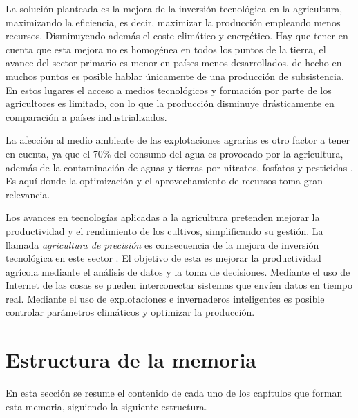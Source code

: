 \documentclass[a4paper, 12pt, oneside]{book}
\begin{document}
La solución planteada es la mejora de la inversión tecnológica en la agricultura, maximizando la eficiencia, es decir, maximizar la producción empleando menos recursos. Disminuyendo además el coste climático y energético. Hay que tener en cuenta que esta mejora no es homogénea en todos los puntos de la tierra, el avance del sector primario es menor en países menos desarrollados, de hecho en muchos puntos es posible hablar únicamente de una producción de subsistencia. En estos lugares el acceso a medios tecnológicos y formación por parte de los agricultores es limitado, con lo que la producción disminuye drásticamente en comparación a países industrializados.

La afección al medio ambiente de las explotaciones agrarias es otro factor a tener en cuenta, ya que el 70\% del consumo del agua es provocado por la agricultura, además de la contaminación de aguas y tierras por nitratos, fosfatos y pesticidas \cite{agricultura_agua}. Es aquí donde la optimización y el aprovechamiento de recursos toma gran relevancia.

Los avances en tecnologías aplicadas a la agricultura pretenden mejorar la productividad y el rendimiento de los cultivos, simplificando su gestión. La llamada \textit{agricultura de precisión} es consecuencia de la mejora de inversión tecnológica en este sector \cite{agricultura_precision}. El objetivo de esta es mejorar la productividad agrícola mediante el análisis de datos y la toma de decisiones. Mediante el uso de Internet de las cosas se pueden interconectar sistemas que envíen datos en tiempo real. Mediante el uso de explotaciones e invernaderos inteligentes es posible controlar parámetros climáticos y optimizar la producción.

\section{Estructura de la memoria}
\label{sec:estructura}

En esta sección se resume el contenido de cada uno de los capítulos que forman esta memoria, siguiendo la siguiente estructura.
\end{document}
